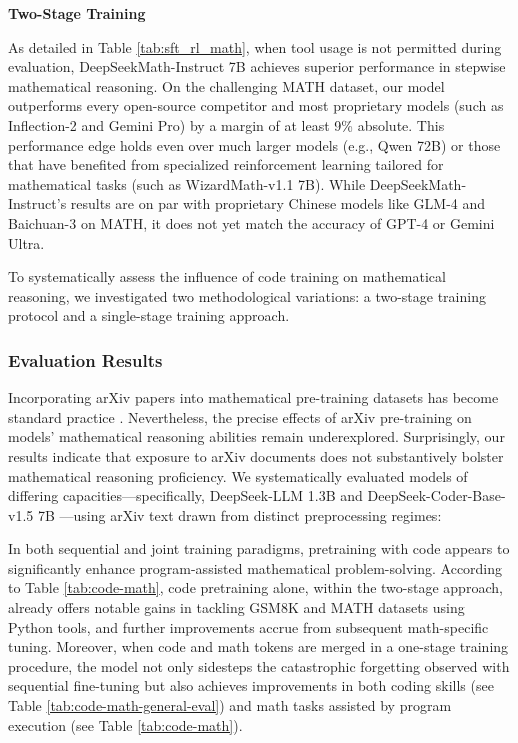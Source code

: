 \begin{itemize}[topsep=0pt]
\textbf{Two-Stage Training}

As detailed in Table \ref{tab:sft_rl_math}, when tool usage is not permitted during evaluation, DeepSeekMath-Instruct 7B achieves superior performance in stepwise mathematical reasoning. On the challenging MATH dataset, our model outperforms every open-source competitor and most proprietary models (such as Inflection-2 and Gemini Pro) by a margin of at least 9\% absolute. This performance edge holds even over much larger models (e.g., Qwen 72B) or those that have benefited from specialized reinforcement learning tailored for mathematical tasks (such as WizardMath-v1.1 7B). While DeepSeekMath-Instruct's results are on par with proprietary Chinese models like GLM-4 and Baichuan-3 on MATH, it does not yet match the accuracy of GPT-4 or Gemini Ultra.

To systematically assess the influence of code training on mathematical reasoning, we investigated two methodological variations: a two-stage training protocol and a single-stage training approach.

\subsubsection{Evaluation Results}

Incorporating arXiv papers into mathematical pre-training datasets has become standard practice \citep{minerva,gpt-f,llemma,mathpile}. Nevertheless, the precise effects of arXiv pre-training on models' mathematical reasoning abilities remain underexplored. Surprisingly, our results indicate that exposure to arXiv documents does not substantively bolster mathematical reasoning proficiency. We systematically evaluated models of differing capacities—specifically, DeepSeek-LLM 1.3B and DeepSeek-Coder-Base-v1.5 7B \citep{deepseek-coder}—using arXiv text drawn from distinct preprocessing regimes:

In both sequential and joint training paradigms, pretraining with code appears to significantly enhance program-assisted mathematical problem-solving. According to Table \ref{tab:code-math}, code pretraining alone, within the two-stage approach, already offers notable gains in tackling GSM8K and MATH datasets using Python tools, and further improvements accrue from subsequent math-specific tuning. Moreover, when code and math tokens are merged in a one-stage training procedure, the model not only sidesteps the catastrophic forgetting observed with sequential fine-tuning but also achieves improvements in both coding skills (see Table \ref{tab:code-math-general-eval}) and math tasks assisted by program execution (see Table \ref{tab:code-math}).


\end{itemize}
